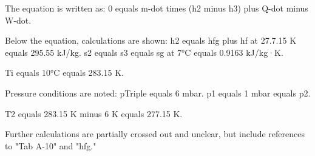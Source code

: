 The equation is written as:  
0 equals m-dot times (h2 minus h3) plus Q-dot minus W-dot.  

Below the equation, calculations are shown:  
h2 equals hfg plus hf at 27.7.15 K equals 295.55 kJ/kg.  
s2 equals s3 equals sg at 7°C equals 0.9163 kJ/kg·K.  

Ti equals 10°C equals 283.15 K.  

Pressure conditions are noted:  
pTriple equals 6 mbar.  
p1 equals 1 mbar equals p2.  

T2 equals 283.15 K minus 6 K equals 277.15 K.  

Further calculations are partially crossed out and unclear, but include references to "Tab A-10" and "hfg."